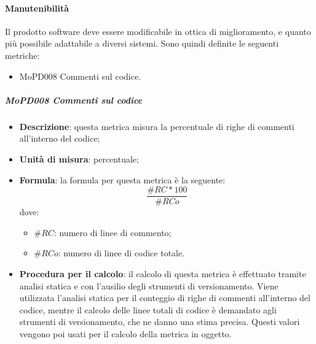 \documentclass[../norme-di-progetto.tex]{subfiles}
\begin{document}
\paragraph{Manutenibilità}
Il prodotto software deve essere modificabile in ottica di miglioramento, e quanto più possibile adattabile a diversi sistemi. Sono quindi definite le seguenti metriche:
\begin{itemize}
  \item MoPD008 Commenti sul codice.
\end{itemize}
\subparagraph{MoPD008 Commenti sul codice}
\begin{itemize}
  \item \textbf{Descrizione}: questa metrica misura la percentuale di righe di commenti all'interno del codice;
  \item \textbf{Unità di misura}: percentuale;
  \item \textbf{Formula}: la formula per questa metrica è la seguente:
  \begin{displaymath}
    \frac{\#RC * 100}{\#RCo}
  \end{displaymath}
  dove:
  \begin{itemize}
    \item $ \#RC $: numero di linee di commento;
    \item $ \#RCo $: numero di linee di codice totale.
  \end{itemize}
  \item \textbf{Procedura per il calcolo}: il calcolo di questa metrica è effettuato tramite analisi statica e con l'ausilio degli strumenti di versionamento. Viene utilizzata l'analisi statica per il conteggio di righe di commenti all'interno del codice, mentre il calcolo delle linee totali di codice è demandato agli strumenti di versionamento, che ne danno una stima precisa. Questi valori vengono poi usati per il calcolo della metrica in oggetto.
\end{itemize}


\newpage
\end{document}

